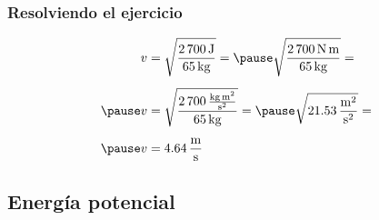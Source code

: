 \documentclass[14pt]{beamer}
\begin{document}
\begin{frame}
\frametitle{Resolviendo el ejercicio}
\pause
\begin{eqnarray*}
\begin{aligned}
v &= \sqrt{\dfrac{2 \, \SI{700}{\joule}}{\SI{65}{\kilo\gram}}} = \pause \sqrt{\dfrac{2 \, \SI{700}{\newton\meter}}{\SI{65}{\kilo\gram}}} = \\[0.5em]\pause 
v &= \sqrt{\dfrac{2 \, \SI[per-mode=fraction]{700}{\kilo\gram\square\meter\per\square\second}}{\SI{65}{\kilo\gram}}} = \pause \sqrt{\SI[per-mode=fraction]{21.53}{\square\meter\per\square\second}} = \\[0.5em] \pause
v &= \SI[per-mode=fraction]{4.64}{\meter\per\second}
\end{aligned}
\end{eqnarray*}
\end{frame}    

\subsection{Energía potencial}
\end{document}
